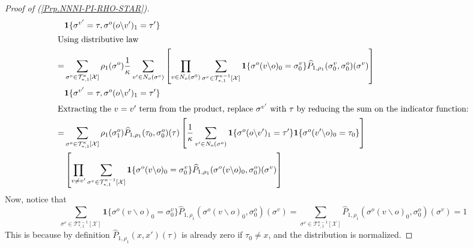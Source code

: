 \documentclass[12pt]{article}
\newcommand{\BS}{\backslash}
\newcommand{\X}{{\mathcal{X}}}
\newcommand{\TT}{{\mathcal{T}}}
\newcommand{\one}[1]{\mathbf{1}\{#1\}}
\newcommand{\tree}[2]{\TT_{*, #1}^{#2}[\X]}
\newcommand{\Ss}{{\rho_1}}
\newcommand{\UE}{\widehat{P}_{1, \Ss}}
\numberwithin{equation}{section}
\begin{document}
\begin{proof}[Proof of (\ref{Prp.NNNI-PI-RHO-STAR})]
\begin{align*}
          & \one{\sigma^{v'} = \tau, \sigma^o(o\BS v')_1 = \tau'}                                                                                                                                                                                                                                            \\
        \intertext{Using distributive law}
        = & \sum_{\sigma^o\in \tree{1}{\kappa}} \Ss(\sigma^o)  \frac1\kappa \sum_{v'\in N_o(\sigma^o)}\left[\prod_{v\in N_o(\sigma^0)}\sum_{\sigma^v\in \tree{1}{\kappa-1}}\one{\sigma^o(v\BS o)_0 = \sigma^v_0}\UE(\sigma^v_0, \sigma^o_0)(\sigma^v)\right]                                                 \\
          & \one{\sigma^{v'} = \tau, \sigma^o(o\BS v')_1 = \tau'}                                                                                                                                                                                                                                            \\
        \intertext{Extracting the $v=v'$ term from the product, replace $\sigma^{v'}$ with $\tau$ by reducing the sum on the indicator function:}
        = & \sum_{\sigma^o\in \tree{1}{\kappa}} \Ss(\sigma^o_1)\UE(\tau_0, \sigma^o_0)(\tau) \left[\frac1\kappa \sum_{v'\in N_o(\sigma^o)}\one{\sigma^o(o\BS v')_1 = \tau'}\one{\sigma^o(v'\backslash o)_0 = \tau_0}\right]                                                                                  \\
          & \left[\prod_{v \neq v'}\sum_{\sigma^v\in \tree{1}{\kappa-1}}\one{\sigma^o(v\backslash o)_0 = \sigma^v_0}\UE(\sigma^o(v\backslash o)_0, \sigma^o_0)(\sigma^v)\right]                                                                                                                              \\
    \end{align*}
    Now, notice that
    \begin{equation*}
        \sum_{\sigma^v\in \tree{1}{\kappa-1}}\one{\sigma^o(v\BS o)_0 = \sigma^v_0}\UE(\sigma^o(v\BS o)_0, \sigma^o_0)(\sigma^v)
        = \sum_{\sigma^v\in \tree{1}{\kappa-1}}\UE(\sigma^o(v\BS o)_0, \sigma^o_0)(\sigma^v) = 1
    \end{equation*}
    This is because by definition $\UE(x, x')(\tau)$ is already zero if $\tau_0 \neq x$, and the distribution is normalized.


\end{proof}
\end{document}

